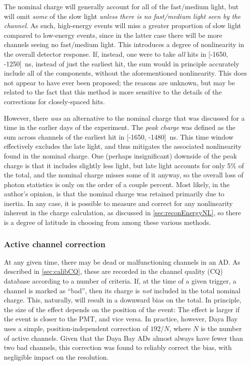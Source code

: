 \documentclass[../thesis.tex]{subfiles}
\begin{document}
The nominal charge will generally account for all of the fast/medium light, but
will omit \emph{some} of the slow light \emph{unless there is no fast/medium
  light seen by the channel}. As such, high-energy events will miss a greater
proportion of slow light compared to low-energy events, since in the latter case
there will be more channels seeing no fast/medium light. This introduces a
degree of nonlinearity in the overall detector response. If, instead, one were
to take \emph{all} hits in [-1650, -1250]~ns, instead of just the earliest hit,
the sum would in principle accurately include all of the components, without the
aforementioned nonlinearity. This does not appear to have ever been proposed;
the reasons are unknown, but may be related to the fact that this method is more
sensitive to the details of the corrections for closely-spaced hits.

However, there \emph{was} an alternative to the nominal charge that was
discussed for a time in the earlier days of the experiment. The \emph{peak
  charge} was defined as the sum across channels of the earliest hit in [-1650,
-1480]~ns. This time window effectively excludes the late light, and thus
mitigates the associated nonlinearity found in the nominal charge. One (perhaps
insignificant) downside of the peak charge is that it includes slightly less
light, but late light accounts for only 5\% of the total, and the nominal charge
misses some of it anyway, so the overall loss of photon statistics is only on
the order of a couple percent. Most likely, in the author's opinion, is that the
nominal charge was retained primarily due to inertia. In any case, it is
possible to measure and correct for any nonlinearity inherent in the charge
calculation, as discussed in \autoref{sec:reconEnergyNL}, so there is a degree
of latitude in choosing from among these various methods.

\subsubsection{Active channel correction}
\label{sec:reconActiveChan}

At any given time, there may be dead or malfunctioning channels in an AD. As
described in \autoref{sec:calibCQ}, these are recorded in the channel quality
(CQ) database according to a number of criteria. If, at the time of a given
trigger, a channel is marked as ``bad'', then its charge is \emph{not} included
in the total nominal charge. This, naturally, will result in a downward bias on
the total. In principle, the size of the effect depends on the position of the
event: The effect is larger if the event is closer to the PMT, and vice
versa. In practice, however, Daya Bay uses a simple, position-independent
correction of $192/N$, where $N$ is the number of active channels. Given that
the Daya Bay ADs almost always have fewer than two bad channels, this correction
was found to reliably correct the bias, with negligible impact on the
resolution.
\end{document}
